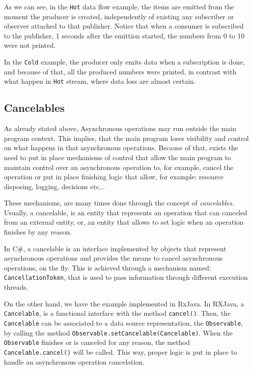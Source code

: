 	
	As we can see, in the \texttt{Hot} data flow example, the items are emitted from the moment the producer is created, independently of existing any subscriber or observer attached to that publisher. Notice that when a consumer is subscribed to the publisher, 1 seconds after the emittion started, the numbers from 0 to 10 were not printed.
	
	In the \texttt{Cold} example, the producer only emits data when a subscription is done, and because of that, all the produced numbers were printed, in contrast with what happen in \texttt{Hot} stream, where data loss are almost certain. 
	\clearpage
	\subsection{Cancelables} 
	As already stated above, Asynchronous operations may run outside the main program context. 
	This implies, that the main program loses visibility and control on what happens in that asynchronous operations.
	Because of that, exists the need to put in place mechanisms of control that allow the main program to maintain control over an asynchronous operation to, for example, cancel the operation or put in place finishing logic that allow, for example: resource disposing, logging, decisions etc...

	These mechanisms, are many times done through the concept of \textit{cancelables}. 
	Usually, a cancelable, is an entity that represents an operation that can canceled from an external entity, or, an entity that allows to set logic when an operation finishes by any reason.
 
	In C\#, a cancelable is an interface implemented by objects that represent asynchronous operations and provides the means to cancel asynchronous operations, on the fly. 
	This is achieved through a mechanism named: \texttt{CancellationToken}, that is used to pass information through different execution threads. 
	
	On the other hand, we have the example implemented in RxJava. 
	In RXJava, a \texttt{Cancelable}, is a functional interface with the method \texttt{cancel()}. Then, the \texttt{Cancelable} can be associated to a data source representation, the \texttt{Observable}, by calling the method \texttt{Observable.setCancelable(Cancelable)}. 
	When the \texttt{Observable} finishes or is canceled for any reason, the method \texttt{Cancelable.cancel()} will be called. 
	This way,  proper logic is put in place to handle an asynchronous operation cancelation.
	
